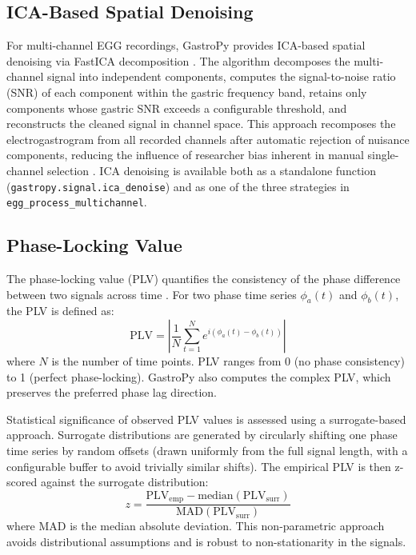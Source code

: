 \documentclass[12pt]{article}
\begin{document}
\subsection{ICA-Based Spatial Denoising}

For multi-channel EGG recordings, GastroPy provides ICA-based spatial
denoising via FastICA decomposition \citep{Pedregosa2011}. The algorithm
decomposes the multi-channel signal into independent components, computes the
signal-to-noise ratio (SNR) of each component within the gastric frequency
band, retains only components whose gastric SNR exceeds a configurable
threshold, and reconstructs the cleaned signal in channel space. This approach
recomposes the electrogastrogram from all recorded channels after automatic
rejection of nuisance components, reducing the influence of researcher bias
inherent in manual single-channel selection \citep{Anisimova2025}. ICA
denoising is available both as a standalone function
(\texttt{gastropy.signal.ica\_denoise}) and as one of the three strategies in
\texttt{egg\_process\_multichannel}.

\subsection{Phase-Locking Value}

The phase-locking value (PLV) quantifies the consistency of the phase
difference between two signals across time \citep{Rebollo2018}. For two phase
time series $\phi_a(t)$ and $\phi_b(t)$, the PLV is defined as:
\begin{equation}
  \text{PLV} = \left| \frac{1}{N} \sum_{t=1}^{N} e^{i(\phi_a(t) - \phi_b(t))} \right|
\end{equation}
where $N$ is the number of time points. PLV ranges from 0 (no phase
consistency) to 1 (perfect phase-locking). GastroPy also computes the complex
PLV, which preserves the preferred phase lag direction.

Statistical significance of observed PLV values is assessed using a
surrogate-based approach. Surrogate distributions are generated by circularly
shifting one phase time series by random offsets (drawn uniformly from the
full signal length, with a configurable buffer to avoid trivially similar
shifts). The empirical PLV is then z-scored against the surrogate distribution:
\begin{equation}
  z = \frac{\text{PLV}_{\text{emp}} - \text{median}(\text{PLV}_{\text{surr}})}
           {\text{MAD}(\text{PLV}_{\text{surr}})}
\end{equation}
where MAD is the median absolute deviation. This non-parametric approach avoids
distributional assumptions and is robust to non-stationarity in the signals.
\end{document}

